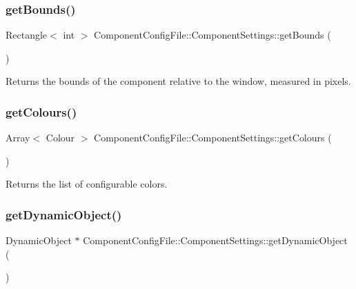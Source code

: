 \subsubsection{\texorpdfstring{get\+Bounds()}{getBounds()}}
{\footnotesize\ttfamily Rectangle$<$ int $>$ Component\+Config\+File\+::\+Component\+Settings\+::get\+Bounds (\begin{DoxyParamCaption}{ }\end{DoxyParamCaption})}

\begin{DoxyReturn}{Returns}
the bounds of the component relative to the window, measured in pixels. 
\end{DoxyReturn}
\mbox{\label{classComponentConfigFile_1_1ComponentSettings_a3434a31b215dfa2b9cdb061f435b576c}} 
\subsubsection{\texorpdfstring{get\+Colours()}{getColours()}}
{\footnotesize\ttfamily Array$<$ Colour $>$ Component\+Config\+File\+::\+Component\+Settings\+::get\+Colours (\begin{DoxyParamCaption}{ }\end{DoxyParamCaption})}

\begin{DoxyReturn}{Returns}
the list of configurable colors. 
\end{DoxyReturn}
\mbox{\label{classComponentConfigFile_1_1ComponentSettings_afa44a2c6847ffe9e49efde041e37a47b}} 
\subsubsection{\texorpdfstring{get\+Dynamic\+Object()}{getDynamicObject()}}
{\footnotesize\ttfamily Dynamic\+Object $\ast$ Component\+Config\+File\+::\+Component\+Settings\+::get\+Dynamic\+Object (\begin{DoxyParamCaption}{ }\end{DoxyParamCaption})}

